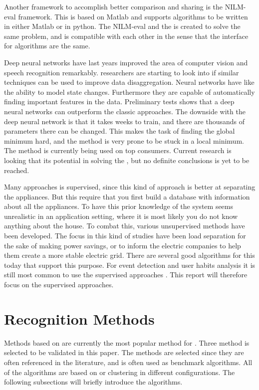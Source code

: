 Another framework to accomplish better comparison and sharing is the NILM-eval framework. This is based on Matlab and supports algorithms to be written in either Matlab or in python. The NILM-eval and the  is created to solve the same problem, and is compatible with each other in the sense that the interface for algorithms are the same\citep{RefWorks:26}. 

Deep neural networks have last years improved the area of computer vision and speech recognition remarkably.  researchers are starting to look into if similar techniques can be used to improve data disaggregation. Neural networks have like  the ability to model state changes. Furthermore they are capable of automatically finding important features in the data. Preliminary tests shows that a deep neural networks can outperform the classic  approaches. The downside with the deep neural network is that it takes weeks to train, and there are thousands of parameters there can be changed. This makes the task of finding the global minimum hard, and the method is very prone to be stuck in a local minimum. The method is currently being used on top consumers\citep{RefWorks:25}. Current research is looking that its potential in solving the , but no definite conclusions is yet to be reached. 

Many approaches is supervised, since this kind of approach is better at separating the appliances. But this require that you first build a database with information about all the appliances. To have this prior knowledge of the system seems unrealistic in an application setting, where it is most likely you do not know anything about the house. To combat this, various unsupervised methods have been developed. The focus in this kind of studies have been load separation for the sake of making power savings, or to inform the electric companies to help them create a more stable electric grid. There are several good algorithms for this today that support this purpose. For event detection and user habits analysis it is still most common to use the supervised approaches \citep{RefWorks:19}. This report will therefore focus on the supervised approaches. 

\newpage
			

\section{Recognition Methods}
\label{RecognitionMethods}
Methods based on  are currently the most popular method for . Three method is selected to be validated in this paper. The methods are selected since they are often referenced in the literature, and is often used as benchmark algorithms. All of the algorithms are based on  or clustering in different configurations. The following subsections will briefly introduce the algorithms. 

